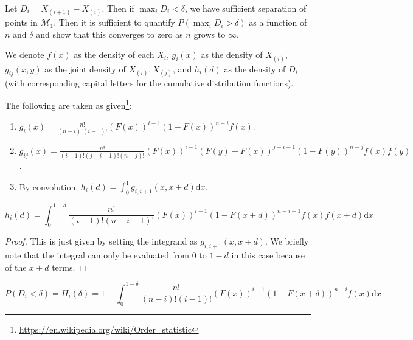 \documentclass[
  11pt,
]{article}
\providecommand{\tightlist}{%
  \setlength{\itemsep}{0pt}\setlength{\parskip}{0pt}}
\begin{document}
Let \(D_i = X_{(i+1)} - X_{(i)}\). Then if \(\max_i D_i < \delta\), we
have sufficient separation of points in \(\mathcal{M}_1\). Then it is
sufficient to quantify \(P(\max_i D_i > \delta)\) as a function of \(n\)
and \(\delta\) and show that this converges to zero as \(n\) grows to
\(\infty\).

We denote \(f(x)\) as the density of each \(X_i\), \(g_i(x)\) as the
density of \(X_{(i)}\), \(g_{ij}(x, y)\) as the joint density of
\(X_{(i)}, X_{(j)}\), and \(h_i(d)\) as the density of \(D_i\) (with
corresponding capital letters for the cumulative distribution
functions).

The following are taken as given\footnote{\url{https://en.wikipedia.org/wiki/Order_statistic}}:

\begin{enumerate}
\def\labelenumi{\arabic{enumi}.}
\tightlist
\item
  \(g_i(x) = \frac{n!}{(n-i)! (i-1)!} (F(x))^{i-1} (1 - F(x))^{n-i} f(x)\).
\item
  \(g_{ij}(x) = \frac{n!}{(i-1)! (j-i-1)! (n-j)!} (F(x))^{i-1} (F(y) - F(x))^{j-i-1} (1 - F(y))^{n-j} f(x) f(y)\).
\item
  By convolution,
  \(h_i(d) = \int_0^{1} g_{i, i+1} (x, x + d) \mathrm{d}x\).
\end{enumerate}

\begin{lemma}
\begin{equation}
\label{eq:pdf}
h_i(d) = \int_0^{1-d} \frac{n!}{(i-1)! (n-i-1)!} (F(x))^{i-1} (1 - F(x+d))^{n-i-1} f(x) f(x+d) \mathrm{d}x 
\end{equation}
\end{lemma}

\begin{proof}
This is just given by setting the integrand as $g_{i, i+1}(x, x+d)$.
We briefly note that the integral can only be evaluated from 0 to $1-d$ in this case because of the $x+d$ terms.
\end{proof}

\begin{lemma}

\begin{equation}
\label{eq:cdf}
P(D_i < \delta) = H_i(\delta) = 1 - \int_0^{1-\delta} \frac{n!}{(n-i)! (i-1)!} (F(x))^{i-1} (1 - F(x + \delta))^{n-i} f(x) \mathrm{d}x
\end{equation}
\end{lemma}
\end{document}
